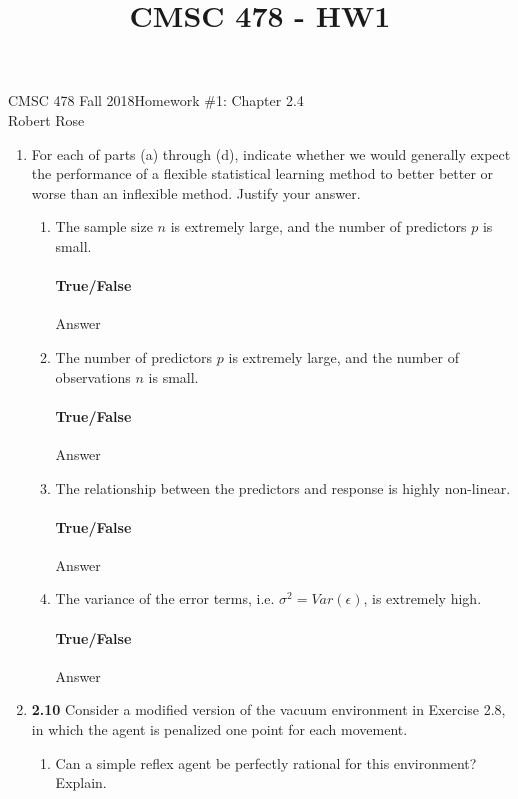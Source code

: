 \documentclass[12pt]{article}
\title{CMSC 478 - HW1}
\begin{document}
CMSC 478 Fall 2018\hfill Homework \#1: Chapter 2.4\\
Robert Rose

\hrulefill

\begin{enumerate}
\item For each of parts (a) through (d), indicate whether we would generally
      expect the performance of a flexible statistical learning method to better
      better or worse than an inflexible method. Justify your answer.
  \begin{enumerate}
  \item The sample size $n$ is extremely large, and the number of predictors
        $p$ is small.\\
  \vspace{-2.5em}
  \paragraph{True/False} Answer

  \item The number of predictors $p$ is extremely large, and the number of
        observations $n$ is small.\\
  \vspace{-2.5em}
  \paragraph{True/False} Answer

  \item The relationship between the predictors and response is highly non-linear.\\
  \vspace{-2.5em}
  \paragraph{True/False} Answer

  \item The variance of the error terms, i.e. $\sigma^2 = Var(\epsilon)$, is extremely high.\\
  \vspace{-2.5em}
  \paragraph{True/False} Answer
  \end{enumerate}
\newpage

\item \textbf{2.10} Consider a modified version of the vacuum environment in Exercise 2.8, in which the
agent is penalized one point for each movement.
  \begin{enumerate}
  \item Can a simple reflex agent be perfectly rational for this environment? Explain.\\
  \vspace{-2.5em}

\end{enumerate}
\end{enumerate}
\end{document}

